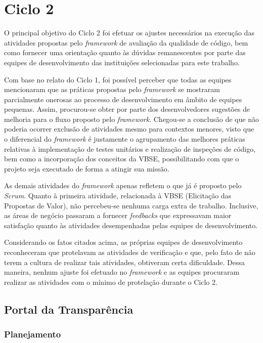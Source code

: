 \clearpage

\section{Ciclo 2}

O principal objetivo do Ciclo 2 foi efetuar os ajustes necessários na execução das atividades propostas pelo \textit{framework} de avaliação da qualidade de código, bem como fornecer uma orientação quanto às dúvidas remanescentes por parte das equipes de desenvolvimento das instituições selecionadas para este trabalho.

Com base no relato do Ciclo 1, foi possível perceber que todas as equipes mencionaram que as práticas propostas pelo \textit{framework} se mostraram parcialmente onerosas ao processo de desenvolvimento em âmbito de equipes pequenas. Assim, procurou-se obter por parte dos desenvolvedores sugestões de melhoria para o fluxo proposto pelo \textit{framework}. Chegou-se a conclusão de que não poderia ocorrer exclusão de atividades mesmo para contextos menores, visto que o diferencial do \textit{framework} é justamente o agrupamento das melhores práticas relativas à implementação de testes unitários e realização de inspeções de código, bem como a incorporação dos conceitos da VBSE, possibilitando com que o projeto seja executado de forma a atingir sua missão.

As demais atividades do \textit{framework} apenas refletem o que já é proposto pelo \textit{Scrum}. Quanto à primeira atividade, relacionada à VBSE (Elicitação das Propostas de Valor), não percebeu-se nenhuma carga extra de trabalho. Inclusive, as áreas de negócio passaram a fornecer \textit{feedbacks} que expressavam maior satisfação quanto às atividades desempenhadas pelas equipes de desenvolvimento.

Considerando os fatos citados acima, as próprias equipes de desenvolvimento reconheceram que protelavam as atividades de verificação e que, pelo fato de não terem a cultura de realizar tais atividades, obtiveram certa dificuldade. Dessa maneira, nenhum ajuste foi efetuado no \textit{framework} e as equipes procuraram realizar as atividades com o mínimo de protelação durante o Ciclo 2.

\subsection{Portal da Transparência}

\subsubsection{Planejamento}

